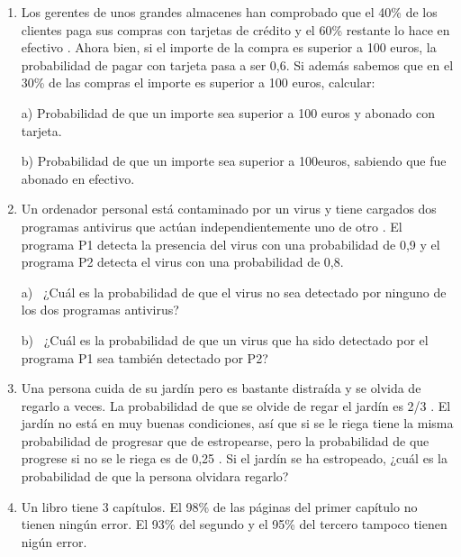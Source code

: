 \begin{adjustwidth}{5mm}{5mm}
\begin{enumerate}[PB. 1. ]
\item Los gerentes de unos grandes almacenes han comprobado que el 40\% de los clientes paga sus compras con tarjetas de crédito y el 60\% restante lo hace en efectivo . Ahora bien, si el importe de la compra es superior a 100 euros, la probabilidad de pagar con tarjeta pasa a ser 0,6. Si además sabemos que en el 30\% de las compras el importe es superior a 100 euros, calcular: 

a) Probabilidad de que un importe sea superior a 100 euros y abonado con tarjeta. 

b) Probabilidad de que un importe sea superior a 100euros, sabiendo que fue abonado en efectivo. 

\hspace{-1cm}\vspace{1cm}


\item Un ordenador personal está contaminado por un virus y tiene cargados dos programas antivirus que actúan independientemente uno de otro . El programa P1 detecta la presencia del virus con una probabilidad de 0,9 y el programa P2 detecta el virus con una probabilidad de 0,8.
 
a)  ¿Cuál es la probabilidad de que el virus no sea detectado por ninguno de los dos programas antivirus? 

b)  ¿Cuál es la probabilidad de que un virus que ha sido detectado por el programa P1 sea también detectado por P2?

\hspace{-1cm}\vspace{1cm}

\item Una persona cuida de su jardín pero es bastante distraída y se olvida de regarlo a veces. La probabilidad de que se olvide de regar el jardín es 2/3 . El jardín no está en muy buenas condiciones, así que si se le riega tiene la misma probabilidad de progresar que de estropearse, pero la probabilidad de que progrese si no se le riega es de 0,25 . Si el jardín se ha estropeado, ¿cuál es la probabilidad de que la persona olvidara regarlo? 

\hspace{-1cm}\vspace{1cm}

\item Un libro tiene 3 capítulos. El 98\% de las páginas del primer capítulo no tienen ningún error. El 93\% del segundo y el 95\% del tercero tampoco tienen nigún error.
 

\end{enumerate}
\end{adjustwidth}

